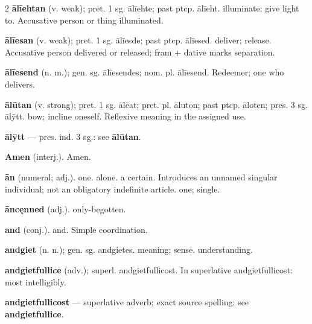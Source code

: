 \begin{multicols*}{2}
\textbf{ālīehtan} (v. weak); pret. 1 sg. ālīehte; past ptcp. ālīeht. illuminate; give light to. Accusative person or thing illuminated.\par
\textbf{ālīesan} (v. weak); pret. 1 sg. ālīesde; past ptcp. ālīesed. deliver; release. Accusative person delivered or released; fram + dative marks separation.\par
\textbf{ālīesend} (n. m.); gen. sg. ālīesendes; nom. pl. ālīesend. Redeemer; one who delivers.\par
\textbf{ālūtan} (v. strong); pret. 1 sg. ālēat; pret. pl. āluton; past ptcp. āloten; pres. 3 sg. ālȳtt. bow; incline oneself. Reflexive meaning in the assigned use.\par
\textbf{ālȳtt} — pres. ind. 3 sg.: see \textbf{ālūtan}.\par
\textbf{Amen} (interj.). Amen.\par
\textbf{ān} (numeral; adj.). one. alone. a certain. Introduces an unnamed singular individual; not an obligatory indefinite article. one; single.\par
\textbf{āncęnned} (adj.). only-begotten.\par
\textbf{and} (conj.). and. Simple coordination.\par
\textbf{andgiet} (n. n.); gen. sg. andgietes. meaning; sense. understanding.\par
\textbf{andgietfullice} (adv.); superl. andgietfullicost. In superlative andgietfullicost: most intelligibly.\par
\textbf{andgietfullicost} — superlative adverb; exact source spelling: see \textbf{andgietfullice}.\par

\end{multicols*}
